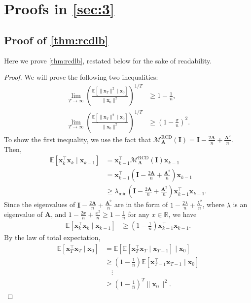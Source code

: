 \documentclass{article}
\theoremstyle{plain}
\theoremstyle{definition}
\theoremstyle{remark}
\def\bigopen#1{\left(#1\right)}
\def\bigclosed#1{\left[#1\right]}
\newcommand{\RCD}{\text{RCD}} %
\newcommand{\MARCD}{\mathcal{M}_{\bm{A}}^{\RCD}} %
\def\vx{{\bm{x}}}
\def\mA{{\bm{A}}}
\def\mI{{\bm{I}}}
\newcommand{\E}{\mathbb{E}}
\newcommand{\R}{\mathbb{R}}
\begin{document}
\section{Proofs in \cref{sec:3}}
\label{sec:b}

\subsection{Proof of \cref{thm:rcdlb}}
\label{subsec:rcdlb}

Here we prove \cref{thm:rcdlb}, restated below for the sake of readability.

\thmrcdlb*

\begin{proof}
We will prove the following two inequalities: 
\begin{align*}
    \lim_{T \to \infty} \bigopen{\frac{\E\bigclosed{\|\vx_T\|^2 \mid \vx_0}}{\|\vx_0\|^2}}^{1/T} &\ge 1 - \frac{1}{n}, \\
    \lim_{T \to \infty} \bigopen{\frac{\E\bigclosed{\|\vx_T\|^2 \mid \vx_0}}{\|\vx_0\|^2}}^{1/T} &\ge \bigopen{1 - \frac{\sigma}{n}}^{2}.
\end{align*}
To show the first inequality, we use the fact that $\MARCD(\mI) = \mI - \frac{2\mA}{n} + \frac{\mA^2}{n}$. Then, 
\begin{align*}
    \E \bigclosed{\vx_k^{\top} \vx_k\mid \vx_{k-1}} &= \vx_{k-1}^{\top} \MARCD(\mI) \vx_{k-1}\\
    &= \vx_{k-1}^{\top} \bigopen{\mI - \frac{2\mA}{n} + \frac{\mA^2}{n}} \vx_{k-1}\\
    &\ge \lambda_{\min} \bigopen{\mI - \frac{2\mA}{n} + \frac{\mA^2}{n}} \vx_{k-1}^{\top} \vx_{k-1}.
\end{align*} Since the eigenvalues of $\mI - \frac{2\mA}{n} + \frac{\mA^2}{n}$ are in the form of $1 - \frac{2\lambda}{n} + \frac{\lambda^2}{n}$, where $\lambda$ is an eigenvalue of $\mA$, and $1 - \frac{2x}{n} + \frac{x^2}{n} \ge 1 - \frac{1}{n}$ for any $x\in \R$, we have
\begin{align*}
    \E \bigclosed{\vx_k^{\top} \vx_k\mid \vx_{k-1}} &\ge \bigopen{1 - \frac{1}{n}}\vx_{k-1}^{\top} \vx_{k-1}.
\end{align*}
By the law of total expectation, 
\begin{align*}
    \E \bigclosed{\vx_T^{\top} \vx_T\mid \vx_0} &= \E \bigclosed{\E \bigclosed{\vx_T ^{\top} \vx_T\mid \vx_{T-1}} \mid \vx_0} \\
    &\ge \bigopen{1 - \frac{1}{n}} \E \bigclosed{\vx_{T-1}^{\top} \vx_{T-1}\mid \vx_0} \\
    &\quad \vdots \\
    &\ge \bigopen{1 - \frac{1}{n}}^T \|\vx_0\|^2.
\end{align*}


\end{proof}
\end{document}

